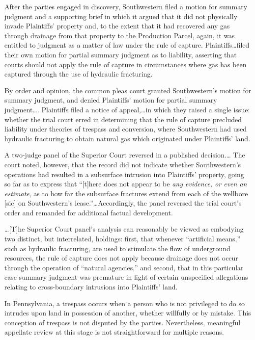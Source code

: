 After the parties engaged in discovery, Southwestern filed a motion for summary
judgment and a supporting brief in which it argued that it did not physically
invade Plaintiffs' property and, to the extent that it had recovered any gas
through drainage from that property to the Production Parcel, again, it was
entitled to judgment as a matter of law under the rule of capture.
Plaintiffs\ldots filed their own motion for partial summary judgment as to
liability, asserting that courts should not apply the rule of capture in
circumstances where gas has been captured through the use of hydraulic
fracturing.

By order and opinion, the common pleas court granted Southwestern's motion for
summary judgment, and denied Plaintiffs' motion for partial summary
judgment\ldots . Plaintiffs filed a notice of appeal,\ldots in which they raised
a single issue: whether the trial court erred in determining that the rule of
capture precluded liability under theories of trespass and conversion, where
Southwestern had used hydraulic fracturing to obtain natural gas which
originated under Plaintiffs' land.


A two-judge panel of the Superior Court reversed in a published decision.\ldots
The court noted, however, that the record did not indicate whether
Southwestern's operations had resulted in a subsurface intrusion into
Plaintiffs' property, going so far as to express that ``[t]here does not appear
to be \textit{any evidence, or even an estimate}, as to how far the subsurface
fractures extend from each of the wellbore [sic] on Southwestern's
lease.''\ldots Accordingly, the panel reversed the trial court's order and
remanded for additional factual development. 

\ldots [T]he Superior Court panel's analysis can reasonably be viewed as
embodying two distinct, but interrelated, holdings: first, that whenever
``artificial means,'' such as hydraulic fracturing, are used to stimulate the
flow of underground resources, the rule of capture does not apply because
drainage does not occur through the operation of ``natural agencies,'' and
second, that in this particular case summary judgment was premature in light of
certain unspecified allegations relating to cross-boundary intrusions into
Plaintiffs' land.


In Pennsylvania, a trespass occurs when a person who is not privileged to do so
intrudes upon land in possession of another, whether willfully or by mistake.
This conception of trespass is not disputed by the parties. Nevertheless,
meaningful appellate review at this stage is not straightforward for multiple
reasons.

